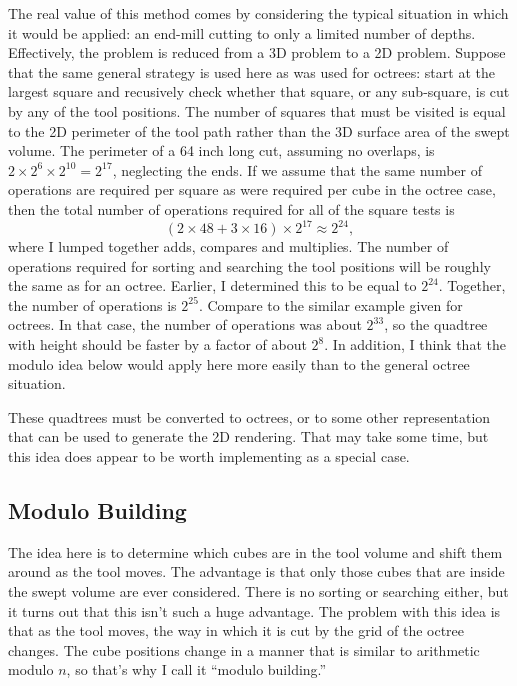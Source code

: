 \documentclass[titlepage,oneside,10pt]{article}
\begin{document}
The real value of this method comes by considering the typical
situation in which it would be applied: an end-mill cutting to only a
limited number of depths. Effectively, the problem is reduced from a
3D problem to a 2D problem. Suppose that the same general strategy is
used here as was used for octrees: start at the largest square and
recusively check whether that square, or any sub-square, is cut by any
of the tool positions. The number of squares that must be visited is
equal to the 2D perimeter of the tool path rather than the 3D surface
area of the swept volume. The perimeter of a 64 inch long cut,
assuming no overlaps, is $2\times 2^6\times 2^{10} = 2^{17}$,
neglecting the ends. If we assume that the same number of operations
are required per square as were required per cube in the octree case,
then the total number of operations required for all of the square
tests is
$$(2\times 48 + 3\times 16)\times 2^{17}\approx 2^{24},$$
where I lumped together adds, compares and multiplies. The number of
operations required for sorting and searching the tool positions will
be roughly the same as for an octree. Earlier, I determined this to be
equal to $2^{24}$. Together, the number of operations is $2^{25}$. Compare
to the similar example given for octrees. In that case, the number of
operations was about $2^{33}$, so the quadtree with height should be
faster by a factor of about $2^8$. In addition, I think that the
modulo idea below would apply here more easily than to the general
octree situation.

These quadtrees must be converted to octrees, or to some other representation
that can be used to generate the 2D rendering. That may take some
time, but this idea does appear to be worth implementing as a special case.

\subsection{Modulo Building}

The idea here is to determine which cubes are in the tool volume and
shift them around as the tool moves. The advantage is that only those
cubes that are inside the swept volume are ever considered. There is
no sorting or searching either, but it turns out that this isn't such
a huge advantage. The problem with this idea is that as the tool
moves, the way in which it is cut by the grid of the octree
changes. The cube positions change in a manner that is similar to
arithmetic modulo $n$, so that's why I call it ``modulo building.''
\end{document}
